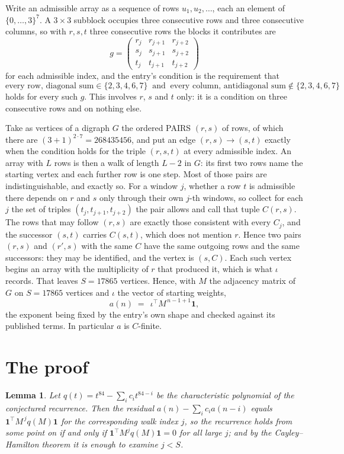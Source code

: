 \documentclass[11pt,a4paper]{article}
\theoremstyle{plain}
\newtheorem{lemma}[theorem]{Lemma}
\theoremstyle{definition}
\begin{document}
Write an admissible array as a sequence of rows $u_1,u_2,\dots$, each an element of
$\{0,\dots,3\}^{7}$. A $3\times3$ subblock occupies three consecutive rows and
three consecutive columns, so with $r,s,t$ three consecutive rows the blocks it
contributes are
\[
g=\begin{pmatrix}r_j&r_{j+1}&r_{j+2}\\ s_j&s_{j+1}&s_{j+2}\\ t_j&t_{j+1}&t_{j+2}\end{pmatrix}
\]
for each admissible index, and the entry's condition is the requirement that
\[
\text{every row, diagonal sum} \in \{2,3,4,6,7\}\ \text{ and }\ \text{every column, antidiagonal sum} \notin \{2,3,4,6,7\}
\]
holds for every such $g$. This involves $r$, $s$ and $t$ only: it is a condition on
three consecutive rows and on nothing else.

Take as vertices of a digraph $G$ the ordered PAIRS $(r,s)$ of rows, of which there are
$(3+1)^{2\cdot7}=268435456$, and put an edge $(r,s)\to(s,t)$ exactly when the condition
holds for the triple $(r,s,t)$ at every admissible index. An array with $L$ rows is then a
walk of length $L-2$ in $G$: its first two rows name the starting vertex and each further
row is one step. Most of those pairs are indistinguishable, and exactly so. For a window $j$, whether a row $t$ is admissible there depends on $r$ and $s$ only through their own $j$-th windows, so collect for each $j$ the set of triples $(t_j,t_{j+1},t_{j+2})$ the pair allows and call that tuple $C(r,s)$. The rows that may follow $(r,s)$ are exactly those consistent with every $C_j$, and the successor $(s,t)$ carries $C(s,t)$, which does not mention $r$. Hence two pairs $(r,s)$ and $(r',s)$ with the same $C$ have the same outgoing rows and the same successors: they may be identified, and the vertex is $(s,C)$. Each such vertex begins an array with the multiplicity of $r$ that produced it, which is what $\iota$ records. That leaves $S=17865$ vertices. Hence, with $M$ the adjacency matrix of $G$ on $S=17865$ vertices and
$\iota$ the vector of starting weights,
\[
a(n)\;=\;\,\iota^{\!\top}M^{\,n-1+1}\mathbf{1},
\]
the exponent being fixed by the entry's own shape and checked against its published terms.
In particular $a$ is $C$-finite.

\section{The proof}

\begin{lemma}\label{lem:crit}
Let $q(t)=t^{84}-\sum_i c_it^{84-i}$ be the characteristic polynomial of the
conjectured recurrence. Then the residual $a(n)-\sum_ic_ia(n-i)$ equals
$\mathbf{1}^{\!\top}M^{\,j}q(M)\mathbf{1}$ for the corresponding walk index
$j$, so the recurrence holds from some point on if and only if
$\mathbf{1}^{\!\top}M^{j}q(M)\mathbf{1}=0$ for all large $j$; and by the
Cayley--Hamilton theorem it is enough to examine $j<S$.
\end{lemma}
\end{document}
